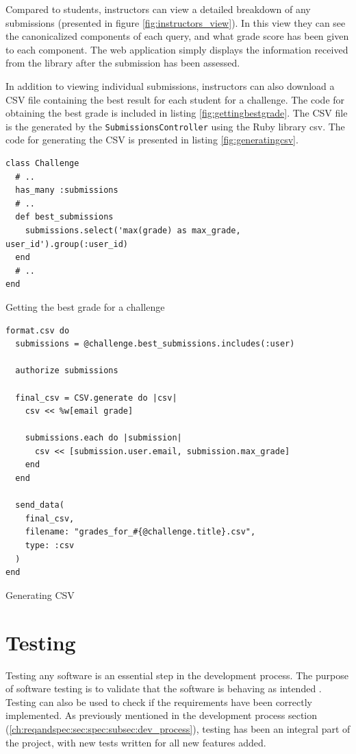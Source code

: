 Compared to students, instructors can view a detailed breakdown of any submissions (presented in figure \ref{fig:instructors_view}). In this view they can see the canonicalized components of each query, and what grade score has been given to each component. The web application simply displays the information received from the library after the submission has been assessed.

In addition to viewing individual submissions, instructors can also download a CSV file containing the best result for each student for a challenge. The code for obtaining the best grade is included in listing \ref{fig:gettingbestgrade}. The CSV file is the generated by the \texttt{SubmissionsController} using the Ruby library csv. The code for generating the CSV is presented in listing \ref{fig:generatingcsv}.

\begin{code}
\begin{verbatim}
class Challenge
  # ..
  has_many :submissions
  # ..
  def best_submissions
    submissions.select('max(grade) as max_grade, user_id').group(:user_id)
  end
  # ..
end
\end{verbatim}
\caption{Getting the best grade for a challenge}
\label{fig:gettingbestgrade}
\end{code}


\begin{code}
\begin{verbatim}
format.csv do
  submissions = @challenge.best_submissions.includes(:user)

  authorize submissions

  final_csv = CSV.generate do |csv|
    csv << %w[email grade]

    submissions.each do |submission|
      csv << [submission.user.email, submission.max_grade]
    end
  end

  send_data(
    final_csv,
    filename: "grades_for_#{@challenge.title}.csv",
    type: :csv
  )
end
\end{verbatim}
\caption{Generating CSV}
\label{fig:generatingcsv}
\end{code}

\section{Testing}
Testing any software is an essential step in the development process. The purpose of software testing is to validate that the software is behaving as intended \citep{lit:software_testing}. Testing can also be used to check if the requirements have been correctly implemented. As previously mentioned in the development process section (\ref{ch:reqandspec:sec:spec:subsec:dev_process}), testing has been an integral part of the project, with new tests written for all new features added.


